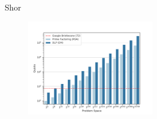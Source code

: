 \documentclass[fleqn,compress,utf8,aspectratio=169,t]{beamer}
\begin{document}
\begin{frame}[noframenumbering]{Shor}
  \begin{figure}[t]
    \includegraphics[width=0.5\textwidth]{plot_line_shor_rsa.pdf}
  \end{figure}
\end{frame}
\end{document}
